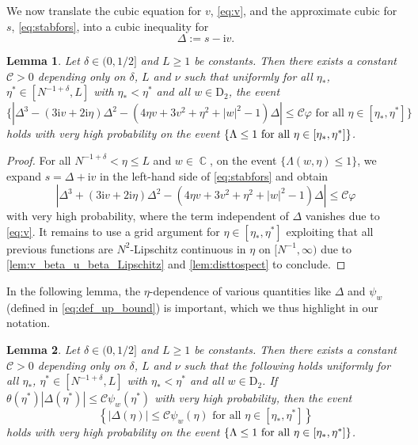 \documentclass[11pt]{article}
\DeclareMathOperator{\CC}{\mathbb{C}}
\newcommand{\ii}{\mathrm{i}}
\newcommand{\abs}[1]{\left| #1 \right|}
\theoremstyle{plain}
\newtheorem{lemma}{Lemma}[section]
\theoremstyle{remark}
\numberwithin{equation}{section}
\newcommand{\nc}{\normalcolor}
\begin{document}
	We now translate the cubic equation for $v$, \eqref{eq:v}, and the approximate cubic for $s$, \eqref{eq:stabfors}, into a cubic inequality for
	\begin{equation*}
		\Delta := s- \ii v.
	\end{equation*} 
	\begin{lemma}\label{lem:3rddegeqonDelta}
		Let $\delta \in (0,1/2]$ and $L \geq 1$ be constants. Then there exists a constant $\mathcal C >0$ depending only on $\delta$, $L$ and $\nu$ such that uniformly for all $\eta_*$, $\eta^* \in [N^{-1+\delta},L]$ with $\eta_* < \eta^*$ and all $w \in \mathrm{D}_2$, the 
		event 
		\[ 
		\{ |\Delta^3 - ( 3 \ii v + 2 \ii \eta)\Delta^2 - (4 \eta v + 3 v^2 + \eta^2 + \abs{w}^2 -1) \Delta| \leq \mathcal C {\varphi} \text{ for all } \eta \in [\eta_*,\eta^*] 
		\}
		\] 
		holds with very high probability on the event $\{  \Lambda \leq 1 \nc  \text{ for all } \eta \in [\eta_*, \eta^*]\}$. 
	\end{lemma} 
	\begin{proof}
		For all $ N^{-1+ \delta} < \eta \le L$ and $w \in \CC$, on the event $\{  \Lambda(w,\eta) \leq 1  \}$, we expand $s =  \Delta + \ii v $ in the left-hand side of \eqref{eq:stabfors}
		and obtain 
		\[ 
		|\Delta^3 + ( 3 \ii v + 2 \ii \eta)\Delta^2 - (4 \eta v + 3 v^2 + \eta^2 + \abs{w}^2 -1) \Delta| \leq \mathcal C { \varphi}
		\] 
		with very high probability, 
		where the term independent of $\Delta$ vanishes due to \eqref{eq:v}. It remains to use a grid argument for $\eta \in [\eta_\ast, \eta^\ast]$ exploiting that all previous functions are $N^{2}$-Lipschitz continuous in $\eta$ on $[N^{-1},\infty)$ due to \cref{lem:v_beta_u_beta_Lipschitz} and \cref{lem:disttospect} to conclude.
	\end{proof}
	
	
	
	
	
	
	
	In the following lemma, the $\eta$-dependence of various quantities like $\Delta$ and $\psi_w$ (defined in \eqref{eq:def_up_bound}) is important, which we thus highlight in our notation. 
	\begin{lemma}\label{lem:Deltasmall}
		Let $\delta \in (0,1/2]$ and $L \geq 1$ be constants. Then there exists a constant $\mathcal C >0$ depending only on $\delta$, $L$ and $\nu$ such that the following holds uniformly for all $\eta_*$, $\eta^* \in [N^{-1+\delta},L]$ with $\eta_* < \eta^*$ and all $w \in \mathrm{D}_2$. If 
		$\theta (\eta^\ast) |\Delta(\eta^{\ast})| \leq \mathcal C \psi_w(\eta^\ast)$
		with very high probability, then the event
		\[ 
		\left\{ |\Delta(\eta)| \leq \mathcal C \psi_w(\eta)  \text{ for all } \eta \in [\eta_*,\eta^*] 
		\right\}
		\] 
		holds with very high probability on the event $\{  \Lambda \leq 1 \nc  \text{ for all } \eta \in [\eta_*, \eta^*]\}$. 
	\end{lemma}
	
\end{document}
